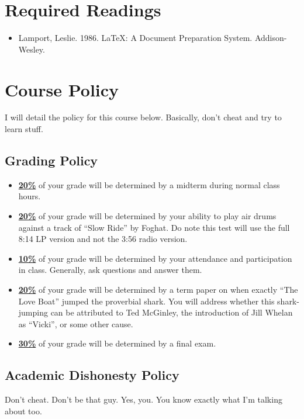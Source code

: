 \documentclass[11pt]{article}
\begin{document}
\section*{Required Readings}

\begin{itemize}
\item Lamport, Leslie. 1986. \LaTeX: A Document Preparation System. Addison-Wesley.
\end{itemize} 


\section*{Course Policy}

I will detail the policy for this course below. Basically, don't cheat and try to learn stuff.

\subsection*{Grading Policy}
\begin{itemize}
	\item \underline{\textbf{20\%}} of your grade will be determined by a midterm during normal class hours.
	\item \underline{\textbf{20\%}} of your grade will be determined by your ability to play air drums against a track of ``Slow Ride'' by Foghat. Do note this test will use the full 8:14 LP version and not the 3:56 radio version.
	\item \underline{\textbf{10\%}} of your grade will be determined by your attendance and participation in class. Generally, ask questions and answer them.
	\item \underline{\textbf{20\%}} of your grade will be determined by a term paper on when exactly ``The Love Boat'' jumped the proverbial shark. You will address whether this shark-jumping can be attributed to Ted McGinley, the introduction of Jill Whelan as ``Vicki'', or some other cause.
	\item \underline{\textbf{30\%}} of your grade will be determined by a final exam.
\end{itemize}

\subsection*{Academic Dishonesty Policy}

Don't cheat. Don't be that guy. Yes, you. You know exactly what I'm talking about too.
\end{document}
